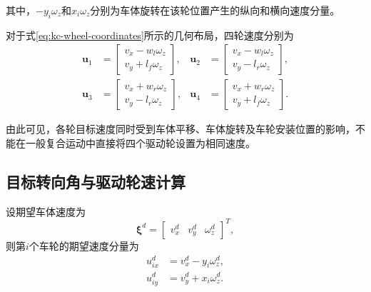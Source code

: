 \documentclass[UTF8,12pt,a4paper,openany]{ctexbook}
\begin{document}
其中，$-y_i\omega_z$和$x_i\omega_z$分别为车体旋转在该轮位置产生的纵向和横向速度分量。

对于式\eqref{eq:kc-wheel-coordinates}所示的几何布局，四轮速度分别为
\begin{equation}
\begin{aligned}
    \boldsymbol{u}_1
    &=
    \begin{bmatrix}
        v_x-w_l\omega_z\\
        v_y+l_f\omega_z
    \end{bmatrix},&
    \boldsymbol{u}_2
    &=
    \begin{bmatrix}
        v_x-w_l\omega_z\\
        v_y-l_r\omega_z
    \end{bmatrix},\\[2mm]
    \boldsymbol{u}_3
    &=
    \begin{bmatrix}
        v_x+w_r\omega_z\\
        v_y-l_r\omega_z
    \end{bmatrix},&
    \boldsymbol{u}_4
    &=
    \begin{bmatrix}
        v_x+w_r\omega_z\\
        v_y+l_f\omega_z
    \end{bmatrix}.
\end{aligned}
\label{eq:kc-four-wheel-velocity}
\end{equation}

由此可见，各轮目标速度同时受到车体平移、车体旋转及车轮安装位置的影响，不能在一般复合运动中直接将四个驱动轮设置为相同速度。

\subsection{目标转向角与驱动轮速计算}

设期望车体速度为
\begin{equation}
    \boldsymbol{\xi}^{d}
    =
    \begin{bmatrix}
        v_x^{d} & v_y^{d} & \omega_z^{d}
    \end{bmatrix}^{T},
\end{equation}
则第$i$个车轮的期望速度分量为
\begin{equation}
\begin{aligned}
    u_{ix}^{d}&=v_x^{d}-y_i\omega_z^{d},\\
    u_{iy}^{d}&=v_y^{d}+x_i\omega_z^{d}.
\end{aligned}
\end{equation}
\end{document}
